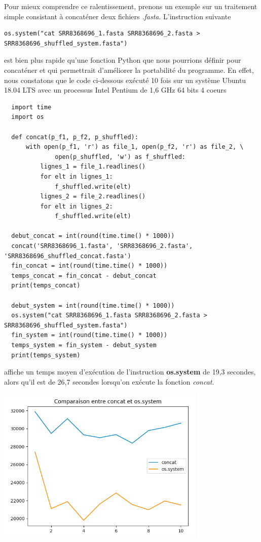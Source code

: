\documentclass[twoside,a4paper,11pt,frenchb,openany]{report}
\begin{document}
Pour mieux comprendre ce ralentissement, prenons un exemple sur un traitement simple consistant à concaténer deux fichiers \textit{.fasta}. L'instruction suivante

\begin{verbatim}os.system("cat SRR8368696_1.fasta SRR8368696_2.fasta > SRR8368696_shuffled_system.fasta")\end{verbatim}

est bien plus rapide qu'une fonction Python que nous pourrions définir pour concaténer et qui permettrait d'améliorer la portabilité du programme. En effet, nous constatons que le code ci-dessous exécuté 10 fois sur un système Ubuntu 18.04 LTS avec un processus Intel Pentium de 1,6 GHz 64 bits 4 coeurs

\begin{verbatim}
  import time
  import os

  def concat(p_f1, p_f2, p_shuffled):
      with open(p_f1, 'r') as file_1, open(p_f2, 'r') as file_2, \
              open(p_shuffled, 'w') as f_shuffled:
          lignes_1 = file_1.readlines()
          for elt in lignes_1:
              f_shuffled.write(elt)
          lignes_2 = file_2.readlines()
          for elt in lignes_2:
              f_shuffled.write(elt)

  debut_concat = int(round(time.time() * 1000))
  concat('SRR8368696_1.fasta', 'SRR8368696_2.fasta', 'SRR8368696_shuffled_concat.fasta')
  fin_concat = int(round(time.time() * 1000))
  temps_concat = fin_concat - debut_concat
  print(temps_concat)

  debut_system = int(round(time.time() * 1000))
  os.system("cat SRR8368696_1.fasta SRR8368696_2.fasta > SRR8368696_shuffled_system.fasta")
  fin_system = int(round(time.time() * 1000))
  temps_system = fin_system - debut_system
  print(temps_system)
\end{verbatim}

affiche un temps moyen d'exécution de l'instruction \textbf{os.system} de 19,3 secondes, alors qu'il est de 26,7 secondes lorsqu'on exécute la fonction \textit{concat}.

\includegraphics[width=10cm]{comparaison_concat.png}
\end{document}
